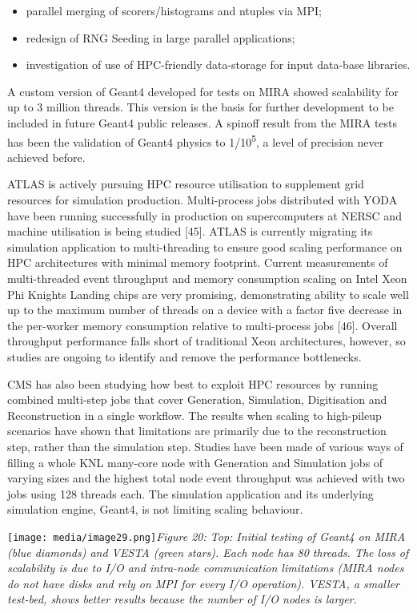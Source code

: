 \documentclass[12pt,a4paper]{article}
\begin{document}
\begin{itemize}
\item
  parallel merging of scorers/histograms and ntuples via MPI;
\item
  redesign of RNG Seeding in large parallel applications;
\item
  investigation of use of HPC-friendly data-storage for input data-base
  libraries.
\end{itemize}

A custom version of Geant4 developed for tests on MIRA showed
scalability for up to 3 million threads. This version is the basis for
further development to be included in future Geant4 public releases. A
spinoff result from the MIRA tests has been the validation of Geant4
physics to 1/10\textsuperscript{5}, a level of precision never achieved
before.

ATLAS is actively pursuing HPC resource utilisation to supplement grid
resources for simulation production. Multi-process jobs distributed with
YODA have been running successfully in production on supercomputers at
NERSC and machine utilisation is being studied {[}45{]}. ATLAS is
currently migrating its simulation application to multi-threading to
ensure good scaling performance on HPC architectures with minimal memory
footprint. Current measurements of multi-threaded event throughput and
memory consumption scaling on Intel Xeon Phi Knights Landing chips are
very promising, demonstrating ability to scale well up to the maximum
number of threads on a device with a factor five decrease in the
per-worker memory consumption relative to multi-process jobs {[}46{]}.
Overall throughput performance falls short of traditional Xeon
architectures, however, so studies are ongoing to identify and remove
the performance bottlenecks.

CMS has also been studying how best to exploit HPC resources by running
combined multi-step jobs that cover Generation, Simulation, Digitisation
and Reconstruction in a single workflow. The results when scaling to
high-pileup scenarios have shown that limitations are primarily due to
the reconstruction step, rather than the simulation step. Studies have
been made of various ways of filling a whole KNL many-core node with
Generation and Simulation jobs of varying sizes and the highest total
node event throughput was achieved with two jobs using 128 threads each.
The simulation application and its underlying simulation engine, Geant4,
is not limiting scaling behaviour.

\texttt{[image: media/image29.png]}\emph{Figure
20: Top: Initial testing of Geant4 on MIRA (blue diamonds) and VESTA
(green stars). Each node has 80 threads. The loss of scalability is due
to I/O and intra-node communication limitations (MIRA nodes do not have
disks and rely on MPI for every I/O operation). VESTA, a smaller
test-bed, shows better results because the number of I/O nodes is
larger. }
\end{document}

